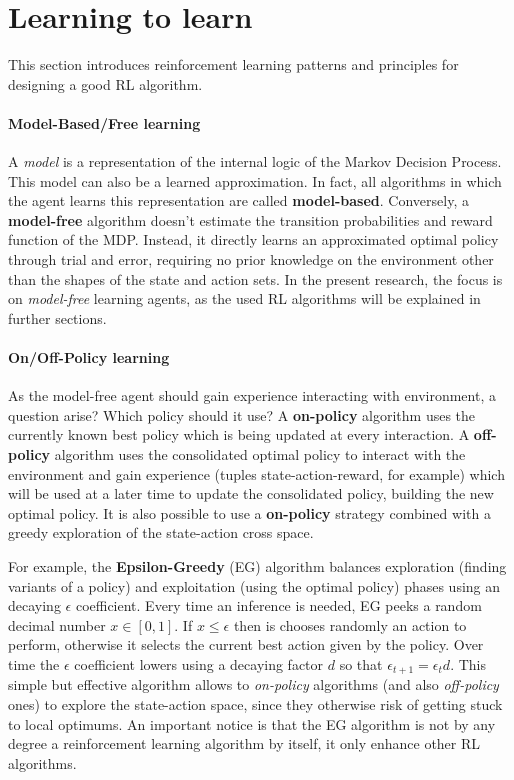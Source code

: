 \section{Learning to learn}

This section introduces reinforcement learning patterns and principles for designing a good RL algorithm.

\paragraph{Model-Based/Free learning}

A \textit{model} is a representation of the internal logic of the Markov Decision Process. This model can also be a learned approximation. In fact, all algorithms in which the agent learns this representation are called \textbf{model-based}. Conversely, a \textbf{model-free} algorithm doesn't estimate the transition probabilities and reward function of the MDP. Instead, it directly learns an approximated optimal policy through trial and error, requiring no prior knowledge on the environment other than the shapes of the state and action sets.
In the present research, the focus is on \textit{model-free} learning agents, as the used RL algorithms will be explained in further sections.

\paragraph{On/Off-Policy learning}

As the model-free agent should gain experience interacting with environment, a question arise? Which policy should it use? A \textbf{on-policy} algorithm uses the currently known best policy which is being updated at every interaction. A \textbf{off-policy} algorithm uses the consolidated optimal policy to interact with the environment and gain experience (tuples state-action-reward, for example) which will be used at a later time to update the consolidated policy, building the new optimal policy. It is also possible to use a \textbf{on-policy} strategy combined with a greedy exploration of the state-action cross space.

For example, the \textbf{Epsilon-Greedy} (EG) \cite{liu2021improving} algorithm balances exploration (finding variants of a policy) and exploitation (using the optimal policy) phases using an decaying $\epsilon$ coefficient.
Every time an inference is needed, EG peeks a random decimal number $x \in [0, 1]$. If $x \leq \epsilon$ then is chooses randomly an action to perform, otherwise it selects the current best action given by the policy.
Over time the $\epsilon$ coefficient lowers using a decaying factor $d$ so that $\epsilon_{t + 1} = \epsilon_{t} d$. This simple but effective algorithm allows to \textit{on-policy} algorithms (and also \textit{off-policy} ones) to explore the state-action space, since they otherwise risk of getting stuck to local optimums.
An important notice is that the EG algorithm is not by any degree a reinforcement learning algorithm by itself, it only enhance other RL algorithms.

